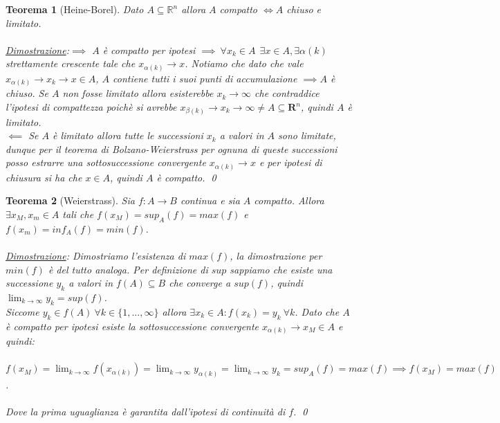 \documentclass[a4paper,12pt]{report}
\newtheorem{teorema}{Teorema}[chapter]
\begin{document}
\begin{teorema}[Heine-Borel]\label{thm: 1.12}
    Dato $A \subseteq \mathbb{R}^n$ allora $A$ compatto $\iff A$ chiuso e limitato.
    \\
    \\ \underline{Dimostrazione}:$\boxed{\implies}$ $A$ è compatto per ipotesi $\implies \ \forall x_k \in A \ \ \exists x \in A, \exists \alpha (k) $ strettamente crescente tale che $x_{\alpha(k)} \to x$. Notiamo che dato che vale $x_{\alpha (k)}\to x_k \to x \in A$, $A$ contiene tutti i suoi punti di accumulazione $\implies A$ è chiuso. Se $A$ non fosse limitato allora esisterebbe $x_k \to \infty$ che contraddice l'ipotesi di compattezza poichè si avrebbe $x_{\beta (k)}\to x_k \to \infty \neq A\subseteq \mathbf{R}^n$, quindi $A$ è limitato. 
    \\ $\boxed{\impliedby}$ Se $A$ è limitato allora tutte le successioni $x_k$ a valori in $A$ sono limitate, dunque per il teorema di Bolzano-Weierstrass per ognuna di queste successioni posso estrarre una sottosuccessione convergente $x_{\alpha (k)}\to x$ e per ipotesi di chiusura si ha che $x \in A$, quindi $A$ è compatto. \qed
\end{teorema}

\begin{teorema}[Weierstrass]\label{thm:1.13}
    Sia $f:A \to B$ continua e sia $A$ compatto. Allora $\exists x_M,x_m\in A$ tali che $f(x_M)=sup_A(f)=max(f)$ e $f(x_m)=inf_A(f)=min(f)$.
    \\
    \\ \underline{Dimostrazione}: Dimostriamo l'esistenza di $max(f)$, la dimostrazione per $min(f)$ è del tutto analoga. Per definizione di $sup$ sappiamo che esiste una successione $y_k$ a valori in $f(A)\subseteq B$ che converge a $sup(f)$, quindi $\displaystyle\lim_{k \to \infty}y_k=sup(f)$. \\Siccome $y_k\in f(A) \ \forall k \in \{1,...,\infty\}$ allora $\exists x_k\in A: f(x_k)=y_k \ \forall k$. Dato che $A$ è compatto per ipotesi esiste la sottosuccessione convergente $x_{\alpha (k)} \to x_M \in A$ e quindi:
    \\
    \\ \mbox{$f(x_M)=\displaystyle\lim_{k \to \infty}f(x_{\alpha (k)})=\lim_{k \to \infty}y_{\alpha (k)}=\lim_{k \to \infty}y_k=sup_A(f)=max(f) \implies f(x_M)=max(f)$}. 
    \\
    \\Dove la prima uguaglianza è garantita dall'ipotesi di continuità di $f$. \qed
    
\end{teorema}
\end{document}

